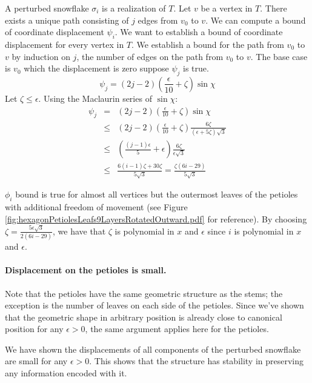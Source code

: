 \documentclass[10pt]{CSUNthesis}
\theoremstyle{plain}%
\theoremstyle{definition}
\theoremstyle{remark}
\newcommand{\lr}[1]{\left( #1 \right)}
\begin{document}
A perturbed snowflake $\sigma_i$ is a realization of $T$.  
Let $v$ be a vertex in $T$.  
There exists a unique path consisting of $j$ edges from $v_0$ to $v$.  
We can compute a bound of coordinate displacement $\psi_i$.  
We want to establish a bound of coordinate displacement for every vertex in $T$.  
We establish a bound for the path from $v_0$ to $v$ by induction on $j$, the number of edges on the path from $v_0$ to $v$.  
The base case is $v_0$ which the displacement is zero suppose $\psi_j$ is true.  
$$\psi_j = (2j-2) \lr{\frac{\epsilon}{10} + \zeta} \sin \chi$$
Let $\zeta \leq \epsilon$.  
Using the Maclaurin series of $\sin \chi$:
$$
\begin{array}{rcl}
\psi_j &=& (2j-2) \lr{\frac{\epsilon}{10} + \zeta} \sin \chi\\
&\leq& (2j-2) \lr{\frac{\epsilon}{10} + \zeta}  \frac{6 \zeta}{\lr{\epsilon + 5 \zeta}\sqrt{3}}\\
&\leq& \lr{\frac{(j-1)\epsilon}{5} + \epsilon} \frac{6 \zeta}{\epsilon\sqrt{3}}\\
&\leq& \frac{6(i-1)\zeta + 30\zeta}{5\sqrt{3}}= \frac{\zeta(6i-29)}{5 \sqrt{3}}
\end{array}
$$

$\phi_i$ bound is true for almost all vertices but the outermost leaves of the petioles with additional freedom of movement (see Figure \ref{fig:hexagonPetiolesLeafs9LayersRotatedOutward.pdf} for reference).  
By choosing $\zeta = \frac{5\epsilon  \sqrt{3}}{2(6i-29)}$, we have that $\zeta$ is polynomial in $x$ and $\epsilon$ since $i$ is polynomial in $x$ and $\epsilon$.
\paragraph{Displacement on the petioles is small.}
Note that the petioles have the same geometric structure as the stems; the exception is the number of leaves on each side of the petioles. 
Since we've shown that the geometric shape in arbitrary position is already close to canonical position for any $\epsilon>0$, the same argument applies here for the petioles.

We have shown the displacements of all components of the perturbed snowflake are small for any $\epsilon > 0$.  
This shows that the structure has stability in preserving any information encoded with it.%
\end{document}
